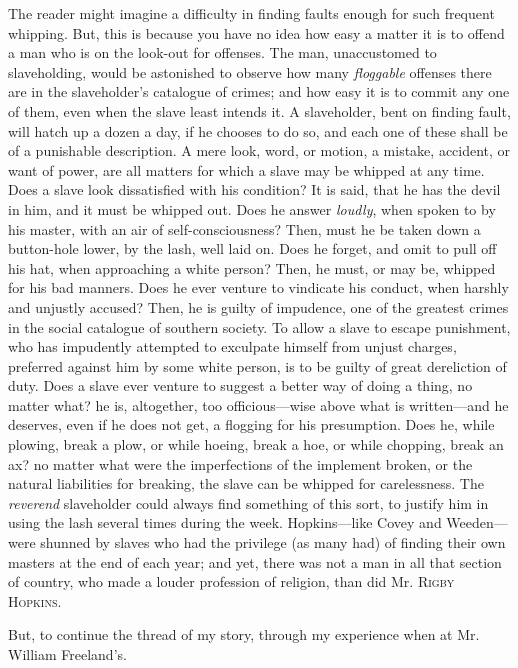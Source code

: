 The reader might imagine a difficulty in finding faults enough for such
frequent whipping. But, this {\protect\hypertarget{260}{}{}}is because
you have no idea how easy a matter it is to offend a man who is on the
look-out for offenses. The man, unaccustomed to slaveholding, would be
astonished to observe how many \emph{floggable} offenses there are in
the slaveholder's catalogue of crimes; and how easy it is to commit any
one of them, even when the slave least intends it. A slaveholder, bent
on finding fault, will hatch up a dozen a day, if he chooses to do so,
and each one of these shall be of a punishable description. A mere look,
word, or motion, a mistake, accident, or want of power, are all matters
for which a slave may be whipped at any time. Does a slave look
dissatisfied with his condition? It is said, that he has the devil in
him, and it must be whipped out. Does he answer \emph{loudly}, when
spoken to by his master, with an air of self-consciousness? Then, must
he be taken down a button-hole lower, by the lash, well laid on. Does he
forget, and omit to pull off his hat, when approaching a white person?
Then, he must, or may be, whipped for his bad manners. Does he ever
venture to vindicate his conduct, when harshly and unjustly accused?
Then, he is guilty of impudence, one of the greatest crimes in the
social catalogue of southern society. To allow a slave to escape
punishment, who has impudently attempted to exculpate himself from
unjust charges, preferred against him by some white person, is to be
guilty of great dereliction of duty. Does a slave ever venture to
suggest a better way of doing a thing, no matter what? he is,
altogether, too officious---wise above what is written---and he
deserves, even if he does not get, a flogging for his presumption. Does
he, while {\protect\hypertarget{261}{}{}}plowing, break a plow, or while
hoeing, break a hoe, or while chopping, break an ax? no matter what were
the imperfections of the implement broken, or the natural liabilities
for breaking, the slave can be whipped for carelessness. The
\emph{reverend} slaveholder could always find something of this sort, to
justify him in using the lash several times during the week.
Hopkins---like Covey and Weeden---were shunned by slaves who had the
privilege (as many had) of finding their own masters at the end of each
year; and yet, there was not a man in all that section of country, who
made a louder profession of religion, than did Mr. \textsc{Rigby
Hopkins}.

But, to continue the thread of my story, through my experience when at
Mr. William Freeland's.


